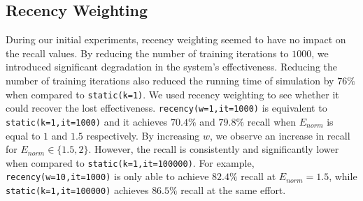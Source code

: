 \subsection*{Recency Weighting}

During our initial experiments, recency weighting seemed to have no
impact on the recall values. By reducing the number of training iterations
to $1000$, we introduced significant degradation in the system's effectiveness.
Reducing the number of training iterations also
reduced the running time of simulation by $76\%$ when compared to
\texttt{static(k=1)}. We used recency weighting to see whether it could recover
the lost effectiveness.  \texttt{recency(w=1,it=1000)} is equivalent to
\texttt{static(k=1,it=1000)} and it achieves $70.4\%$ and $79.8\%$
recall when $E_{norm}$ is equal to $1$ and $1.5$ respectively. By increasing
$w$, we observe an increase in recall for $E_{norm} \in \{1.5, 2\}$. However,
the recall is consistently and significantly lower when compared to
\texttt{static(k=1,it=100000)}. For example, \texttt{recency(w=10,it=1000)} is
only able to achieve $82.4\%$ recall at $E_{norm}=1.5$, while
\texttt{static(k=1,it=100000)} achieves $86.5\%$ recall at the same effort.


\begin{table}[]
\centering
\caption{Summary of results for recency weighting}
\label{table.recency}
\end{table}

